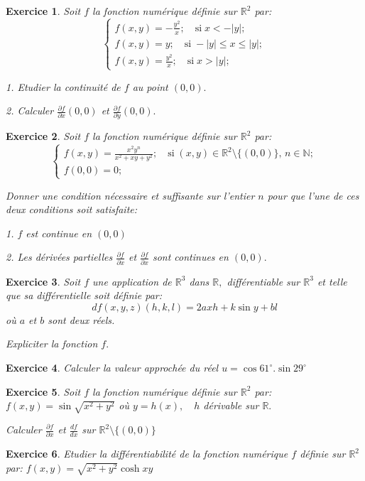 \documentclass[11pt,a4paper]{report}
\newtheorem{exo}{Exercice}[section]
\begin{document}
\begin{exo}
Soit $f$ la fonction numérique définie sur $\mathbb{R}^2$ par:
$$\begin{cases}
f(x,y)=-\frac{y^2}{x}; \quad\mbox{si}\;x<-|y|;\\
f(x,y)=y ; \quad\mbox{si}\;-|y|\leq x\leq |y|;\\
f(x,y)=\frac{y^2}{x}; \quad\mbox{si}\;x>|y|;
\end{cases}$$

1. Etudier la continuité de $f$ au point $(0,0).$

2. Calculer $\frac{\partial f}{\partial x}(0,0)$ et $\frac{\partial f}{\partial y}(0,0).$
\end{exo}

\begin{exo}
Soit $f$ la fonction numérique définie sur $\mathbb{R}^2$ par:
$$\begin{cases}
f(x,y)=\frac{x^2 y^n}{x^2+xy+y^2}; \quad\mbox{si}\;(x,y)\in \mathbb{R}^2\setminus \{(0,0)\},\,n\in \mathbb{N};\\
f(0,0)=0;
\end{cases}$$

Donner une condition nécessaire et suffisante sur l'entier $n$ pour que l'une de ces deux conditions soit satisfaite:

1. $f$ est continue en $(0,0)$

2. Les dérivées partielles $\frac{\partial f}{\partial x}$ et $\frac{\partial f}{\partial x}$ sont continues en $(0,0).$
\end{exo}
\begin{exo}
Soit $f$ une application de $\mathbb{R}^3$ dans $\mathbb{R},$ différentiable sur $\mathbb{R}^3$ et telle que sa différentielle soit définie par:
$$df(x,y,z)(h,k,l)=2axh+k\sin y+b l$$
où $a$ et $b$ sont deux réels.

Expliciter la fonction $f.$
\end{exo}
\begin{exo}
Calculer la valeur approchée du réel $u=\cos 61^{\circ}.\sin 29^{\circ}$
\end{exo}
\begin{exo}
Soit $f$ la fonction numérique définie sur $\mathbb{R}^2$ par: $f(x,y)=\sin \sqrt{x^2+y^2}$ où $y=h(x),\quad h$ dérivable sur $\mathbb{R}.$

Calculer $\frac{\partial f}{\partial x}$ et $\frac{d f}{dx}$ sur $\mathbb{R}^2\setminus\{(0,0)\}$
\end{exo}
\begin{exo}
Etudier la différentiabilité de la fonction numérique $f$ définie sur $\mathbb{R}^2$ par: $f(x,y)=\sqrt{x^2+y^2}\cosh xy$
\end{exo}
\end{document}
